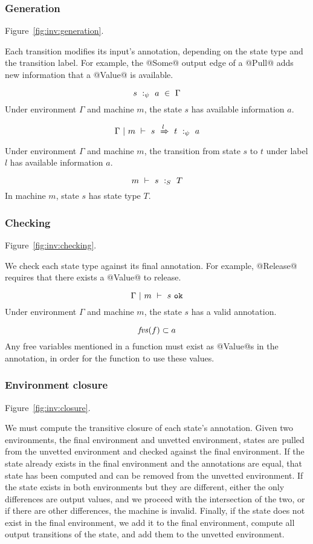 

\subsubsection{Generation}
Figure~\ref{fig:inv:generation}.

Each transition modifies its input's annotation, depending on the state type and the transition label.
For example, the @Some@ output edge of a @Pull@ adds new information that a @Value@ is available.

$$ s~:_\psi~ a ~\in~ \Gamma $$
Under environment $\Gamma$ and machine $m$, the state $s$ has available information $a$.

$$ \Gamma ~|~ m ~\vdash~ s~\xRightarrow{l}~t ~:_\psi~ a $$
Under environment $\Gamma$ and machine $m$, the transition from state $s$ to $t$ under label $l$ has available information $a$.

$$ m ~\vdash~ s ~:_S~ T $$
In machine $m$, state $s$ has state type $T$.


\subsubsection{Checking}
Figure~\ref{fig:inv:checking}.

We check each state type against its final annotation. For example, @Release@ requires that there exists a @Value@ to release.

$$ \Gamma ~|~ m ~\vdash~ s~\mathtt{ok} $$
Under environment $\Gamma$ and machine $m$, the state $s$ has a valid annotation.

$$ \mathit{fvs}(f) \subset a $$
Any free variables mentioned in a function must exist as @Value@s in the annotation, in order for the function to use these values.

\subsubsection{Environment closure}
Figure~\ref{fig:inv:closure}.

We must compute the transitive closure of each state's annotation.
Given two environments, the final environment and unvetted environment, states are pulled from the unvetted environment and checked against the final environment.
If the state already exists in the final environment and the annotations are equal, that state has been computed and can be removed from the unvetted environment.
If the state exists in both environments but they are different, either the only differences are output values, and we proceed with the intersection of the two, or if there are other differences, the machine is invalid.
Finally, if the state does not exist in the final environment, we add it to the final environment, compute all output transitions of the state, and add them to the unvetted environment.

